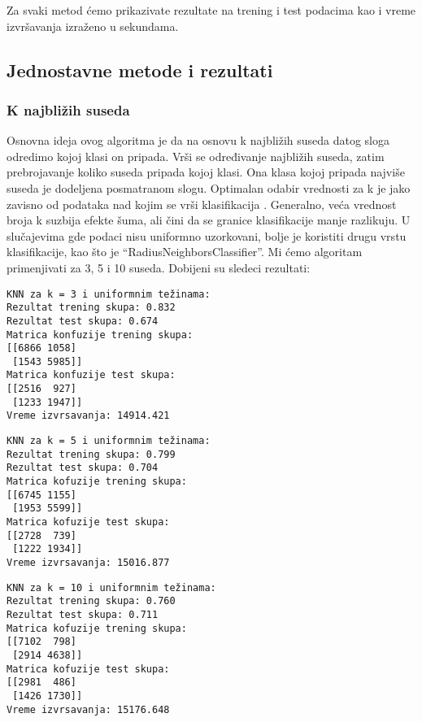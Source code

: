 \documentclass[a4paper]{article}
\begin{document}
Za svaki metod ćemo prikazivate rezultate na trening i test podacima kao i vreme izvršavanja izraženo u sekundama.


\subsection{Jednostavne metode i rezultati}

\subsubsection{K  najbližih suseda}

Osnovna ideja ovog algoritma je  da na osnovu k najbližih suseda datog sloga odredimo kojoj klasi on
pripada. Vrši se određivanje najbližih suseda, zatim prebrojavanje koliko suseda pripada kojoj
klasi. Ona klasa kojoj pripada najviše suseda je dodeljena posmatranom slogu.
Optimalan odabir vrednosti za k je jako zavisno od podataka nad kojim se
vrši klasifikacija \cite{KNN} . Generalno, veća vrednost broja k suzbija efekte šuma,
ali čini da se granice klasifikacije manje razlikuju. U slučajevima gde podaci nisu uniformno uzorkovani, bolje je koristiti drugu vrstu klasifikacije,
kao što je “RadiusNeighborsClassifier”.
Mi ćemo  algoritam primenjivati  za 3, 5 i 10 suseda.
Dobijeni su sledeci rezultati:

\begin{tcolorbox}
\begin{verbatim}
KNN za k = 3 i uniformnim težinama:
Rezultat trening skupa: 0.832
Rezultat test skupa: 0.674
Matrica konfuzije trening skupa:
[[6866 1058]
 [1543 5985]]
Matrica konfuzije test skupa:
[[2516  927]
 [1233 1947]]
Vreme izvrsavanja: 14914.421
\end{verbatim}
\end{tcolorbox}

\begin{tcolorbox}
\begin{verbatim}
KNN za k = 5 i uniformnim težinama:
Rezultat trening skupa: 0.799
Rezultat test skupa: 0.704
Matrica kofuzije trening skupa:
[[6745 1155]
 [1953 5599]]
Matrica kofuzije test skupa:
[[2728  739]
 [1222 1934]]
Vreme izvrsavanja: 15016.877
\end{verbatim}
\end{tcolorbox}

\begin{tcolorbox}
\begin{verbatim}
KNN za k = 10 i uniformnim težinama:
Rezultat trening skupa: 0.760
Rezultat test skupa: 0.711
Matrica kofuzije trening skupa:
[[7102  798]
 [2914 4638]]
Matrica kofuzije test skupa:
[[2981  486]
 [1426 1730]]
Vreme izvrsavanja: 15176.648
\end{verbatim}
\end{tcolorbox}
\end{document}
